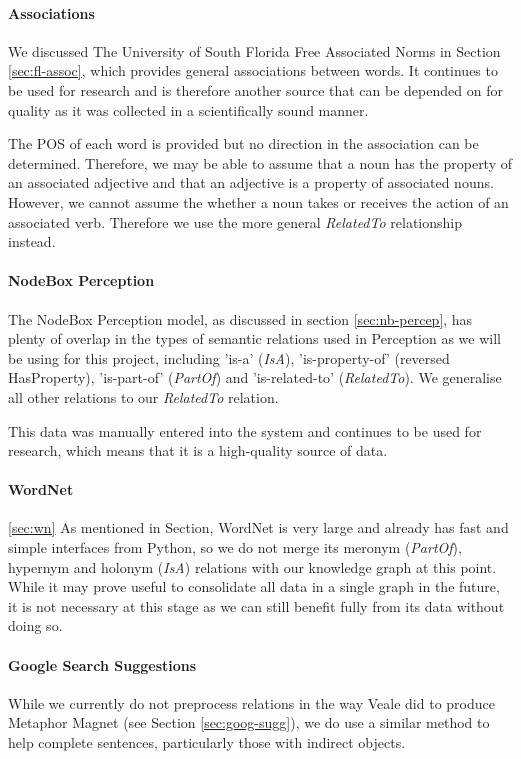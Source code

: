 \paragraph{Associations}
We discussed The University of South Florida Free Associated Norms in Section \ref{sec:fl-assoc}, which provides general associations between words. It continues to be used for research and is therefore another source that can be depended on for quality as it was collected in a scientifically sound manner.

The POS of each word is provided but no direction in the association can be determined. Therefore, we may be able to assume that a noun has the property of an associated adjective and that an adjective is a property of associated nouns. However, we cannot assume the whether a noun takes or receives the action of an associated verb. Therefore we use the more general \textit{RelatedTo} relationship instead.

\paragraph{NodeBox Perception}
The NodeBox Perception model, as discussed in section \ref{sec:nb-percep}, has plenty of overlap in the types of semantic relations used in Perception as we will be using for this project, including 'is-a' (\textit{IsA}), 'is-property-of' (reversed HasProperty), 'is-part-of' (\textit{PartOf}) and 'is-related-to' (\textit{RelatedTo}). We generalise all other relations to our \textit{RelatedTo} relation.

This data was manually entered into the system and continues to be used for research, which means that it is a high-quality source of data.

\paragraph{WordNet}
\ref{sec:wn}
As mentioned in Section, WordNet is very large and already has fast and simple interfaces from Python, so we do not merge its meronym (\textit{PartOf}), hypernym and holonym (\textit{IsA}) relations with our knowledge graph at this point. While it may prove useful to consolidate all data in a single graph in the future, it is not necessary at this stage as we can still benefit fully from its data without doing so.

\paragraph{Google Search Suggestions}
While we currently do not preprocess relations in the way Veale did to produce Metaphor Magnet (see Section \ref{sec:goog-sugg}), we do use a similar method to help complete sentences, particularly those with indirect objects. 

